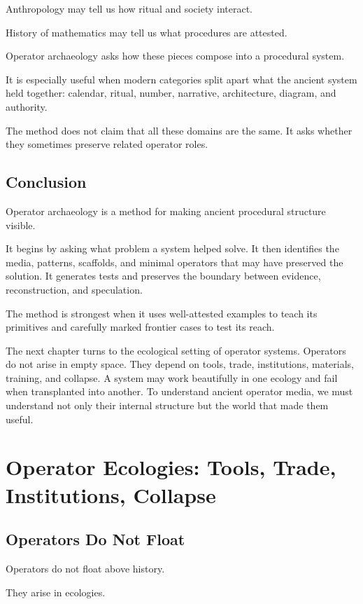 \documentclass[11pt]{book}
\begin{document}
Anthropology may tell us how ritual and society interact.

History of mathematics may tell us what procedures are attested.

Operator archaeology asks how these pieces compose into a procedural system.

It is especially useful when modern categories split apart what the ancient system held together: calendar, ritual, number, narrative, architecture, diagram, and authority.

The method does not claim that all these domains are the same. It asks whether they sometimes preserve related operator roles.

\section{Conclusion}

Operator archaeology is a method for making ancient procedural structure visible.

It begins by asking what problem a system helped solve. It then identifies the media, patterns, scaffolds, and minimal operators that may have preserved the solution. It generates tests and preserves the boundary between evidence, reconstruction, and speculation.

The method is strongest when it uses well-attested examples to teach its primitives and carefully marked frontier cases to test its reach.

The next chapter turns to the ecological setting of operator systems. Operators do not arise in empty space. They depend on tools, trade, institutions, materials, training, and collapse. A system may work beautifully in one ecology and fail when transplanted into another. To understand ancient operator media, we must understand not only their internal structure but the world that made them useful.

\chapter{Operator Ecologies: Tools, Trade, Institutions, Collapse}

\section{Operators Do Not Float}

Operators do not float above history.

They arise in ecologies.
\end{document}
